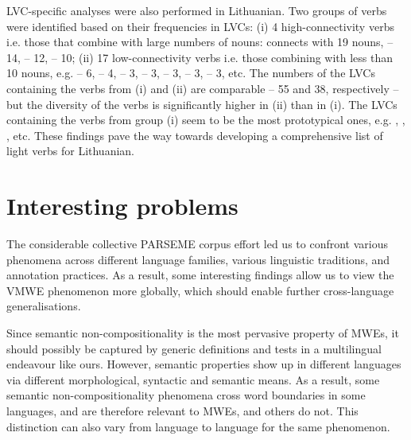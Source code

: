 \documentclass[output=paper,
modfonts,
]{langscibook}
\begin{document}
LVC-specific analyses were also performed in Lithuanian. Two groups of verbs were identified based on their frequencies in LVCs: 
(i) 4 high-connectivity verbs i.e. those that combine with large numbers of nouns:   connects with 19 nouns,  -- 14,  -- 12,  -- 10; 
(ii) 17 low-connectivity verbs i.e. those combining with less than 10 nouns, e.g.  -- 6,  -- 4,  -- 3,  -- 3,  -- 3,   -- 3,  -- 3, etc. 
The numbers of the LVCs containing the verbs from (i) and (ii) are comparable -- 55 and 38, respectively -- but the diversity of the verbs is significantly higher in (ii) than in (i). 
The LVCs containing the verbs from group (i) seem to be the most prototypical ones, e.g. , , , etc. These findings pave the way towards developing a comprehensive list of light verbs for Lithuanian.

\section{Interesting problems}
\label{sec:findings}
%
The considerable collective PARSEME corpus effort led us to confront various phenomena across different language families, various linguistic traditions, and annotation practices. As a result, some interesting findings allow us to view the VMWE phenomenon more globally, which should enable further cross-language generalisations. 

Since semantic non-compositionality is the most pervasive property of MWEs, it should possibly be captured by generic definitions and tests in a multilingual endeavour like ours. However, semantic properties show up in different languages via different morphological, syntactic and semantic means. As a result, some semantic non-compositionality phenomena cross word boundaries in some languages, and are therefore relevant to MWEs, and others do not. This distinction can also vary from language to language for the same phenomenon.
\end{document}
